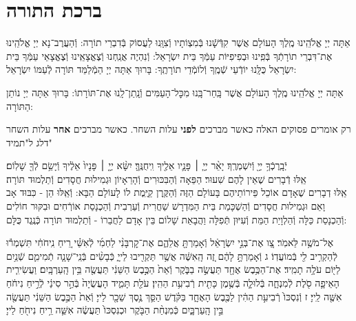 \documentclass[twoside, openany, parskip=half, 11pt]{book}
\begin{document}
\section[ברכת התורה]{ ברכת התורה }

אַתָּה יְיָ אֱלֹהֵֽינוּ מֶֽלֶךְ הָעוֹלָם אֲשֶׁר קִדְּֿשָֽֿׁנוּ בְּֿמִצְוֹתָיו וְֿצִוָּֽנוּ לַעֲסוֹק בְּֿדִבְרֵי תוֹרָה: וְֿהַעֲרֶב־נָא יְיָ אֱלֹהֵֽינוּ אֶת־דִּבְרֵי תוֹרָתְֿךָ בְּֿפִֽינוּ וּבְפִיפִיּוֹת עַמְּֿךָ בֵּית יִשְׂרָאֵל: וְֿנִהְיֶה אֲנַֽחְנוּ וְֿצֶאֱצָאֵֽינוּ וְֿצֶאֱצָאֵי עַמְּֿךָ בֵּית יִשְׂרָאֵל כֻּלָּֽנוּ יוֹדְֿעֵי שְֿׁמֶֽךָ וְֿלוֹמְֿדֵי תוֹרָתֶֽךָ: בָּרוּךְ אַתָּה יְיָ הַמְֿלַמֵּד תּוֹרָה לְֿעַמּוֹ יִשְׂרָאֵל:

אַתָּה יְיָ אֱלֹהֵֽינוּ מֶֽלֶךְ הָעוֹלָם אֲשֶׁר בָּֽחַר־בָּֽנוּ מִכׇּל־הָעַמִּים וְֿנָֽתַן־לָֽנוּ אֶת־תּוֹרָתוֹ: בָּרוּךְ אַתָּה יְיָ נוֹתֵן הַתּוֹרָה:

\nextpage

\begin{sometimes}

\begin{scriptsize}
\textsf{
רק אומרים פסוקים האלה כאשר מברכים \textbf{לפני} עלות השחר.
כאשר מברכים \textbf{אחר} עלות השחר דלג ל"תמיד"}

\end{scriptsize}

יְֿבָֽרֶכְֿךָ֥ יְיָ֖ וְֿיִשְׁמְרֶֽךָ׃ יָאֵ֨ר יְיָ֧ ׀ פָּנָ֛יו אֵלֶ֖יךָ וִֽיחֻנֶּֽךָּ׃ יִשָּׂ֨א יְיָ֤ ׀ פָּנָיו֙ אֵלֶ֔יךָ וְֿיָשֵׂ֥ם לְֿךָ֖ שָׁלֽוֹם׃\\
אֵֽלּוּ דְֿבָרִים שֶׁאֵין לָהֶם שִׁעוּר׃ הַפֵּאָה וְֿהַבִּכּוּרִים וְֿהָרֵאָיוֹן וּגְמִילוּת חֲסָדִים וְֿתַלְמוּד תּוֹרָה׃\\
אֵֽלּוּ דְבָרִים שֶׁאָדָם אוֹכֵל פֵּירוֹתֵיהֶם בָּעוֹלָם הַזֶּה וְֿהַקֶּֽרֶן קַיֶּֽמֶת לוֹ לָעוֹלָם הַבָּא: וְֿאֵֽלּוּ הֵן - כִּבּוּד אָב וָאֵם וּגְמִילוּת חֲסָדִים וְֿהַשְׁכָּמַת בֵּית הַמִּדְרָשׁ שַׁחֲרִית וְֿעַרְבִית וְֿהַכְנָסַת אוֹרְֿחִים וּבִקּוּר חוֹלִים וְֿהַכְנָסַת כַּלָּה וְֿהַלְוָיַת הַמֵּת וְֿעִיּוּן תְּֿפִלָּה וַהֲבָאַת שָׁלוֹם בֵּין אָדָם לַחֲבֵרוֹ - וְֿתַלְמוּד תּוֹרָה כְּֿנֶֽגֶד כֻּלָּם:

\end{sometimes}


אֶל־מֹשֶׁ֥ה לֵּאמֹֽר׃
צַ֚ו אֶת־בְּנֵ֣י יִשְׂרָאֵ֔ל וְֿאָמַרְתָּ֖ אֲלֵהֶ֑ם אֶת־קׇרְבָּנִ֨י לַחְמִ֜י לְֿאִשַּׁ֗י רֵ֚יחַ נִֽיחֹחִ֔י תִּשְׁמְר֕וּ לְֿהַקְרִ֥יב לִ֖י בְּֿמוֹעֲדֽוֹ׃ ג
וְֿאָמַרְתָּ֣ לָהֶ֔ם זֶ֚ה הָֽאִשֶּׁ֔ה אֲשֶׁ֥ר תַּקְרִ֖יבוּ לַייָ֑ כְּֿבָשִׂ֨ים בְּֿנֵֽי־שָׁנָ֧ה תְֿמִימִ֛ם שְֿׁנַ֥יִם לַיּ֖וֹם עֹלָ֥ה תָמִֽיד׃
אֶת־הַכֶּ֥בֶשׂ אֶחָ֖ד תַּעֲשֶׂ֣ה בַבֹּ֑קֶר וְֿאֵת֙ הַכֶּ֣בֶשׂ הַשֵּׁנִ֔י תַּעֲשֶׂ֖ה בֵּ֥ין הָֽעַרְבָּֽיִם׃
וַעֲשִׂירִ֧ית הָאֵיפָ֛ה סֹ֖לֶת לְֿמִנְחָ֑ה בְּֿלוּלָ֛ה בְּֿשֶׁ֥מֶן כָּתִ֖ית רְֿבִיעִ֥ת הַהִֽין׃
עֹלַ֖ת תָּמִ֑יד הָעֲשֻׂיָה֙ בְּֿהַ֣ר סִינַ֔י לְֿרֵ֣יחַ נִיחֹ֔חַ אִשֶּׁ֖ה לַֽייָ׃ ז וְֿנִסְכּוֹ֙ רְֿבִיעִ֣ת הַהִ֔ין לַכֶּ֖בֶשׂ הָאֶחָ֑ד בַּקֹּ֗דֶשׁ הַסֵּ֛ךְ נֶ֥סֶךְ שֵׁכָ֖ר לַייָ׃
וְֿאֵת֙ הַכֶּ֣בֶשׂ הַשֵּׁנִ֔י תַּעֲשֶׂ֖ה בֵּ֣ין הָֽעַרְבָּ֑יִם כְּֿמִנְחַ֨ת הַבֹּ֤קֶר וּכְנִסְכּוֹ֙ תַּעֲשֶׂ֔ה אִשֵּׁ֛ה רֵ֥יחַ נִיחֹ֖חַ לַייָ׃
\end{document}
